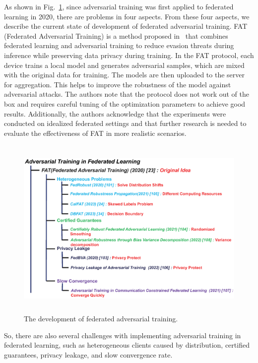 As shown in Fig.~\ref{fig20}, since adversarial training was first applied to
federated learning in 2020, there are problems in four
aspects. From these four aspects, we describe the current
state of development of federated adversarial training.
FAT (Federated Adversarial Training) is a method
proposed in~\cite{zizzo2020fat} that combines federated learning and
adversarial training to reduce evasion threats during
inference while preserving data privacy during training.
In the FAT protocol, each device trains a local model and
generates adversarial samples, which are mixed with the
original data for training. The models are then uploaded
to the server for aggregation. This helps to improve the
robustness of the model against adversarial attacks. The
authors note that the protocol does not work out of
the box and requires careful tuning of the optimization
parameters to achieve good results. Additionally, the
authors acknowledge that the experiments were conducted
on idealized federated settings and that further research
is needed to evaluate the effectiveness of FAT in more
realistic scenarios.  

\begin{figure}[h]
    \centering
    \includegraphics[width=1.0\linewidth,height=3.5in]{output/fig20.eps}
     \caption{The development of federated adversarial training.}
     \label{fig20}
\end{figure}


So, there are also several challenges with
implementing adversarial training in federated learning, such as
heterogeneous clients caused by distribution, certified
guarantees, privacy leakage, and slow convergence rate.

